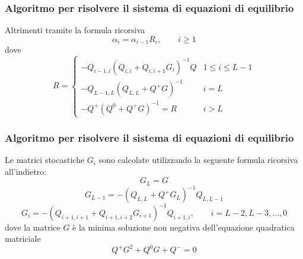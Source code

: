 \documentclass{beamer}
\begin{document}
\begin{frame}
    \frametitle{Algoritmo per risolvere il sistema di equazioni di equilibrio}
    \begin{theorem}
        Altrimenti tramite la formula ricorsiva
        \begin{equation*}\label{eq:rec-alpha}
            \alpha_i = \alpha_{i-1} R_i, \qquad i \geq 1
        \end{equation*}
        dove
        \begin{equation*}
            R =
            \begin{cases}
                -Q_{i-1,i}(Q_{i,i} + Q_{i,i+1}G_i)^{-1}Q & 1 \leq i \leq L-1 \\
                -Q_{L-1,L}(Q_{L,L} + Q^+G)^{-1} & i = L \\
                -Q^+(Q^0 + Q^+G)^{-1} = R & i>L
            \end{cases}
        \end{equation*}
    \end{theorem}
\end{frame}


\begin{frame}
    \frametitle{Algoritmo per risolvere il sistema di equazioni di equilibrio}
    \begin{theorem}
        Le matrici stocastiche $G_i$ sono calcolate utilizzando la seguente formula ricorsiva all'indietro:
            $$G_L = G$$
            $$G_{L-1} = -(Q_{L,L} + Q^+G_L)^{-1}Q_{L,L-1}$$
            $$G_i = -(Q_{i+1,i+1} + Q_{i+1,i+2}G_{i+1})^{-1}Q_{i+1,i}, \qquad i = L-2, L-3, \dots, 0$$
        dove la matrice $G$ è la minima soluzione non negativa dell'equazione quadratica matriciale
        \begin{equation*}
            Q^+G^2 + Q^0G + Q^- = 0
        \end{equation*}
    \end{theorem}
\end{frame}
\end{document}
